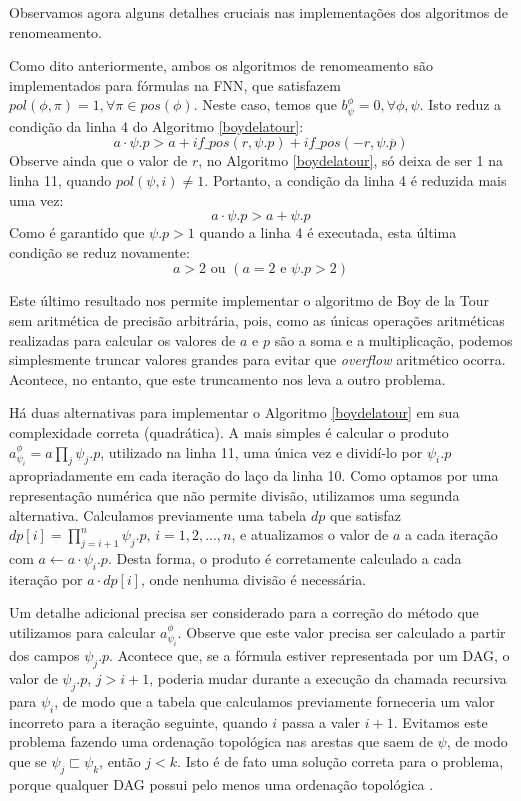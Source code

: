 Observamos agora alguns detalhes cruciais nas implementações dos algoritmos de renomeamento.

Como dito anteriormente, ambos os algoritmos de renomeamento são implementados para fórmulas na FNN, que satisfazem $pol(\phi,\pi) = 1, \forall \pi \in pos(\phi)$. Neste caso, temos que $b_\psi^\phi = 0, \forall \phi,\psi$. Isto reduz a condição da linha 4 do Algoritmo \ref{boydelatour}: $$a \cdot \psi.p > a + if\_pos(r,\psi.p) + if\_pos(-r,\psi.\overline{p})$$ Observe ainda que o valor de $r$, no Algoritmo \ref{boydelatour}, só deixa de ser 1 na linha 11, quando $pol(\psi,i) \neq 1$. Portanto, a condição da linha 4 é reduzida mais uma vez: $$a \cdot \psi.p > a + \psi.p$$ Como é garantido que $\psi.p > 1$ quando a linha 4 é executada, esta última condição se reduz novamente: $$a > 2 \text{ ou } (a = 2 \text{ e } \psi.p > 2)$$

Este último resultado nos permite implementar o algoritmo de Boy de la Tour sem aritmética de precisão arbitrária, pois, como as únicas operações aritméticas realizadas para calcular os valores de $a$ e $p$ são a soma e a multiplicação, podemos simplesmente truncar valores grandes para evitar que \textit{overflow} aritmético ocorra. Acontece, no entanto, que este truncamento nos leva a outro problema.

Há duas alternativas para implementar o Algoritmo \ref{boydelatour} em sua complexidade correta (quadrática). A mais simples é calcular o produto $a_{\psi_i}^\phi = a \prod_{j} \psi_j.p$, utilizado na linha 11, uma única vez e dividí-lo por $\psi_i.p$ apropriadamente em cada iteração do laço da linha 10. Como optamos por uma representação numérica que não permite divisão, utilizamos uma segunda alternativa. Calculamos previamente uma tabela $dp$ que satisfaz\break $dp[i] = \prod_{j=i+1}^{n} \psi_j.p$, $i = 1,2,...,n$, e atualizamos o valor de $a$ a cada iteração com $a \gets a \cdot \psi_i.p$. Desta forma, o produto é corretamente calculado a cada iteração por $a \cdot dp[i]$, onde nenhuma divisão é necessária.

Um detalhe adicional precisa ser considerado para a correção do método que utilizamos para calcular $a_{\psi_i}^\phi$. Observe que este valor precisa ser calculado a partir dos campos $\psi_j.p$. Acontece que, se a fórmula estiver representada por um DAG, o valor de $\psi_j.p$, $j > i+1$, poderia mudar durante a execução da chamada recursiva para $\psi_i$, de modo que a tabela que calculamos previamente forneceria um valor incorreto para a iteração seguinte, quando $i$ passa a valer $i+1$. Evitamos este problema fazendo uma ordenação topológica nas arestas que saem de $\psi$, de modo que se $\psi_j \sqsubset \psi_k$, então $j < k$. Isto é de fato uma solução correta para o problema, porque qualquer DAG possui pelo menos uma ordenação topológica \cite{CLRS09}.

